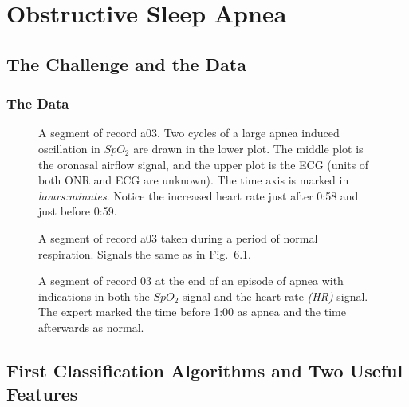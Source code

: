\documentclass[prelim,showlabels]{book}
\begin{document}
\chapter{Obstructive Sleep Apnea}
\label{chap:apnea}

\section{The  Challenge and the Data}
\label{sec:challenge}

\subsection{The Data}
\label{sec:data}
\begin{figure}
  \caption[A segment of record a03]%
  {A segment of record a03.  Two cycles of a large apnea
    induced oscillation in $SpO_2$ are drawn in the lower plot.  The
    middle plot is the oronasal airflow signal, and the upper plot is
    the ECG (units of both ONR and ECG are unknown).  The time
    axis is marked in \emph{hours:minutes}.  Notice the increased
    heart rate just after 0:58 and just before 0:59.}
  \label{fig:a03erA}
\end{figure}

\begin{figure}
  \caption[A segment of record a03]%
  {A segment of record a03 taken during a period of normal
    respiration.  Signals the same as in Fig.~6.1.}
  \label{fig:a03erN}
\end{figure}

\begin{figure}
  \caption[A segment of record 03 at the end of an episode of apnea]%
  {A segment of record 03 at the end of an episode of apnea with
    indications in both the $SpO_2$ signal and the heart rate
    \emph{(HR)} signal.  The expert marked the time before 1:00 as
    apnea and the time afterwards as normal.}
  \label{fig:a03erHR}
\end{figure}

\section{First Classification Algorithms and Two Useful Features}
\label{sec:NVG}
\end{document}
